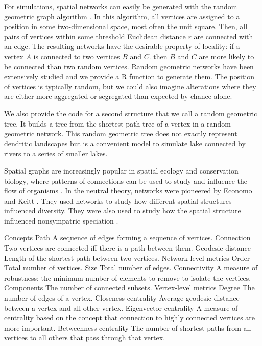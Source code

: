 \documentclass[12pt]{article}
\begin{document}
For simulations, spatial networks can easily be generated with the random
geometric graph algorithm \cite{sed01}. In this algorithm, all vertices are
assigned to a position in some two-dimensional space, most often the unit
square. Then, all pairs of vertices within some threshold Euclidean distance $r$
are connected with an edge. The resulting networks have the desirable
property of locality: if a vertex $A$ is connected to two vertices $B$ and $C$.
then $B$ and $C$ are more likely to be connected than two random vertices.
Random geometric networks have been extensively studied \cite{app97a,app97
b,app02a,app02b,pen03} and we provide a R function to generate them. The 
position of vertices is typically random, but we could also imagine alterations
where they are either more aggregated or segregated than expected by chance alone.

We also provide the code for a second structure that we call a random geometric
tree.  It builds a tree from the shortest path tree \cite{dij59} of a vertex in
a random geometric network. This random geometric tree does not exactly
represent dendritic landscapes but is a convenient model to simulate lake
connected by rivers to a series of smaller lakes.

Spatial graphs are increasingly popular in spatial ecology and conservation
biology, where patterns of connections can be used to study and influence the
flow of organisms \cite{min07,fal07,min08,gar08,urb09,dal10}. In the neutral
theory, networks were pioneered by Economo and Keitt \cite{eco08, eco10}.  They
used networks to study how different spatial structures influenced diversity.
They were also used to study how the spatial structure influenced nonsympatric
speciation \cite{des12,des12b}.

Concepts
Path A sequence of edges forming a sequence of vertices.
Connection Two vertices are connected iff there is a path between them.
Geodesic distance Length of the shortest path between two vertices.
Network-level metrics
Order Total number of vertices.
Size Total number of edges.
Connectivity A measure of robustness: the minimum number of elements to remove
to isolate the vertices.
Components The number of connected subsets.
Vertex-level metrics
Degree The number of edges of a vertex.
Closeness centrality Average geodesic distance between a vertex and all other vertex.
Eigenvector centrality A measure of centrality based on the concept that connection to
highly connected vertices are more important.
Betweenness centrality The number of shortest paths from all vertices to all others that
pass through that vertex.
\end{document}
